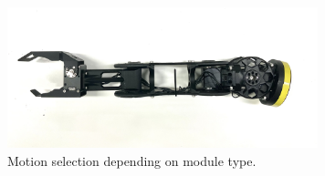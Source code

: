 \begin{figure}[t]
  \centering
  \includegraphics[width=90mm]{./fig/leg_configuration/gripper_module.jpg}
  \vspace{2mm}
  \caption{Motion selection depending on module type.}\label{gripmodule}
\end{figure}

